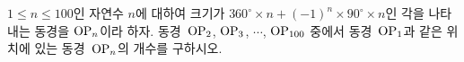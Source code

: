 $1\le n\le 100$인 자연수 $n$에 대하여 크기가 $360^\circ\times n+(-1)^n\times 90^\circ\times n$인 각을 나타내는 동경을 $\mathrm{OP}_n$이라 하자. 동경~$\mathrm{OP}_2$, $\mathrm{OP}_3$, $\cdots$, $\mathrm{OP}_{100}$ 중에서 동경~$\mathrm{OP}_1$과 같은 위치에 있는 동경~$\mathrm{OP}_n$의 개수를 구하시오. 

